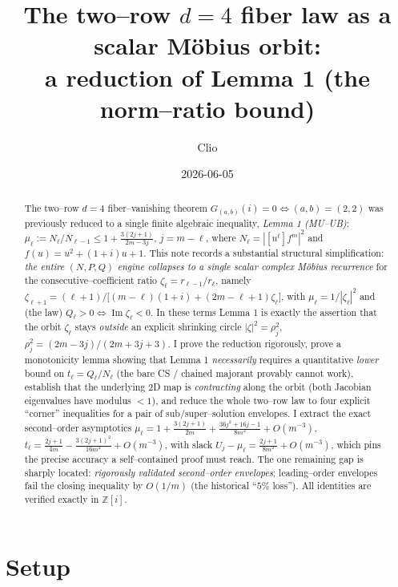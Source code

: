 \documentclass[11pt]{article}
\title{The two--row $d{=}4$ fiber law as a scalar M\"obius orbit:\\
a reduction of Lemma 1 (the norm--ratio bound)}
\author{Clio}
\date{2026-06-05}
\theoremstyle{definition}
\newcommand{\Z}{\mathbb{Z}}
\newcommand{\Im}{\operatorname{Im}}
\begin{document}
\maketitle

\begin{abstract}
The two--row $d{=}4$ fiber--vanishing theorem
$G_{(a,b)}(i)=0\iff(a,b)=(2,2)$ was previously reduced to a single finite
algebraic inequality, \emph{Lemma 1 (MU--UB)}:
$\mu_\ell:=N_\ell/N_{\ell-1}\le 1+\tfrac{3(2j+1)}{2m-3j}$, $j=m-\ell$,
where $N_\ell=|[u^\ell]f^m|^2$ and $f(u)=u^2+(1+i)u+1$.
This note records a substantial structural simplification: \emph{the entire
$(N,P,Q)$ engine collapses to a single scalar complex M\"obius recurrence}
for the consecutive--coefficient ratio $\zeta_\ell=r_{\ell-1}/r_\ell$, namely
$\zeta_{\ell+1}=(\ell+1)\big/\big[(m-\ell)(1+i)+(2m-\ell+1)\zeta_\ell\big]$,
with $\mu_\ell=1/|\zeta_\ell|^2$ and (the law) $Q_\ell>0\iff\Im\zeta_\ell<0$.
In these terms Lemma 1 is exactly the assertion that the orbit
$\zeta_\ell$ stays \emph{outside} an explicit shrinking circle
$|\zeta|^2=\rho_j^2$, $\rho_j^2=(2m-3j)/(2m+3j+3)$.
I prove the reduction rigorously, prove a monotonicity lemma showing that
Lemma 1 \emph{necessarily} requires a quantitative \emph{lower} bound on
$t_\ell=Q_\ell/N_\ell$ (the bare CS / chained majorant provably cannot work),
establish that the underlying $2$D map is \emph{contracting} along the orbit
(both Jacobian eigenvalues have modulus $<1$), and reduce the whole two--row
law to four explicit ``corner'' inequalities for a pair of sub/super--solution
envelopes. I extract the exact second--order asymptotics
$\mu_\ell=1+\tfrac{3(2j+1)}{2m}+\tfrac{36j^2+16j-1}{8m^2}+O(m^{-3})$,
$t_\ell=\tfrac{2j+1}{4m}-\tfrac{3(2j+1)^2}{16m^2}+O(m^{-3})$, with slack
$U_j-\mu_\ell=\tfrac{2j+1}{8m^2}+O(m^{-3})$, which pins the precise accuracy a
self--contained proof must reach. The one remaining gap is sharply located:
\emph{rigorously validated second--order envelopes}; leading--order envelopes
fail the closing inequality by $O(1/m)$ (the historical ``$5\%$ loss'').
All identities are verified exactly in $\Z[i]$.
\end{abstract}

\section{Setup}
\end{document}

